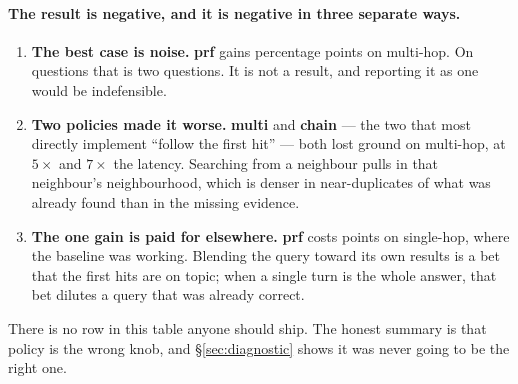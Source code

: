 \paragraph{The result is negative, and it is negative in three separate ways.}

\begin{enumerate}[leftmargin=*]
\item \textbf{The best case is noise.} \textbf{prf} gains \rBestDelta{}
  percentage points on multi-hop. On \rQmulti{} questions that is two questions.
  It is not a result, and reporting it as one would be indefensible.
\item \textbf{Two policies made it worse.} \textbf{multi} and \textbf{chain} ---
  the two that most directly implement ``follow the first hit'' --- both lost
  ground on multi-hop, at $5\times$ and $7\times$ the latency. Searching from a
  neighbour pulls in that neighbour's neighbourhood, which is denser in
  near-duplicates of what was already found than in the missing evidence.
\item \textbf{The one gain is paid for elsewhere.} \textbf{prf} costs
  \rWorstDelta{} points on single-hop, where the baseline was working. Blending
  the query toward its own results is a bet that the first hits are on topic;
  when a single turn is the whole answer, that bet dilutes a query that was
  already correct.
\end{enumerate}

There is no row in this table anyone should ship. The honest summary is that
policy is the wrong knob, and \S\ref{sec:diagnostic} shows it was never going to
be the right one.

